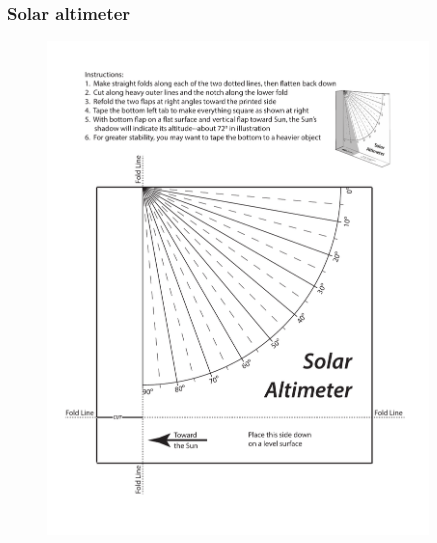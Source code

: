 \documentclass[main.tex]{subfiles}
\begin{document}
\subsubsection{Solar altimeter}
\begin{figure}[h!]
\begin{center}
\includegraphics[width=0.9\textwidth]{sun-altimeter.pdf}
\label{fig:altim}
\end{center}
\end{figure}
\end{document}
